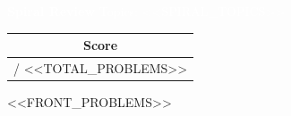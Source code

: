 \documentclass[12pt]{article}
\newcommand{\scorebox}{%
  \begin{tikzpicture}[baseline=(current bounding box.center)]
    \node[draw=medgray, rounded corners=2pt, inner sep=2pt,
          minimum width=0.9cm, minimum height=0.5cm, font=\tiny]
      {Y \quad N};
  \end{tikzpicture}%
}
\newcounter{probnum}
\newcommand{\problem}[1]{%
  \stepcounter{probnum}%
  \vspace{4pt}%
  \noindent
  \begin{minipage}[t]{0.06\textwidth}
    \textbf{\large\theprobnum.}
  \end{minipage}%
  \begin{minipage}[t]{0.84\textwidth}
    \setlength{\parindent}{0pt}%
    #1
  \end{minipage}%
  \hfill
  \begin{minipage}[t]{0.06\textwidth}
    \raggedleft\scorebox
  \end{minipage}%
  \vspace{\stretch{1}}%
  \noindent\textcolor{lightgray}{\hrule height 0.4pt}%
  \vspace{2pt}%
}
\begin{document}
\Large

\noindent
\colorbox{headerblue}{\parbox{\dimexpr\textwidth}{%
  \vspace{3pt}
  \centering\large\textbf{\textcolor{white}{Spiral Review}}%
  \quad\textcolor{white}{\textbar}\quad
  \textcolor{white}{\normalsize Topics: <<SPIRAL_TOPICS>>}
  \vspace{3pt}
}}
\vspace{6pt}

\begin{flushright}
  \begin{tabular}{|c|}
    \hline
    \textbf{Score} \\
    \hline
    \rule{0pt}{18pt}\underline{\hspace{0.8cm}} / <<TOTAL_PROBLEMS>> \\
    \hline
  \end{tabular}
\end{flushright}
\vspace{-8pt}


<<FRONT_PROBLEMS>>

\end{document}
